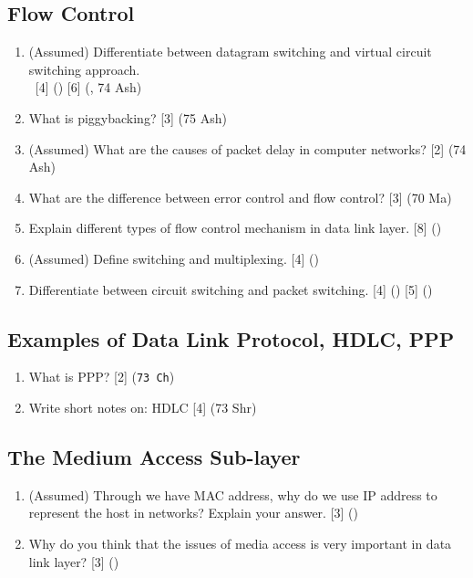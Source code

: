 \documentclass[12pt]{article}
\newcommand{\enter}{\\\textcolor{white}{1}}
\begin{document}
	\subsection{Flow Control}
		\begin{enumerate}[noitemsep, topsep=0pt]
			\item (Assumed) Differentiate between datagram switching and virtual circuit switching approach.
			\enter\hfill [4] () [6] (, 74 Ash)

			\item What is piggybacking? \hfill [3] (75 Ash)

			\item (Assumed) What are the causes of packet delay in computer networks? \hfill [2] (74 Ash)

			\item What are the difference between error control and flow control? \hfill [3] (70 Ma)

			\item Explain different types of flow control mechanism in data link layer. \hfill [8] ()

			\item (Assumed) Define switching and multiplexing. \hfill [4] ()

			\item Differentiate between circuit switching and packet switching. \hfill [4] () [5] ()
		\end{enumerate}

	\subsection{Examples of Data Link Protocol, HDLC, PPP}
		\begin{enumerate}
			\item What is PPP? \hfill[2] (\texttt{73 Ch})

			\item Write short notes on: HDLC \hfill [4] (73 Shr)
		\end{enumerate}
	\subsection{The Medium Access Sub-layer}
		\begin{enumerate}[noitemsep, topsep=0pt]
			\item (Assumed) Through we have MAC address, why do we use IP address to represent the host in networks? Explain your answer. \hfill [3] ()

			\item Why do you think that the issues of media access is very important in data link layer? \hfill [3] ()
		\end{enumerate}
\end{document}
